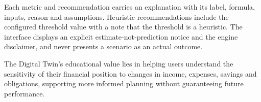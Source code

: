 Each metric and recommendation carries an explanation with its label, formula, inputs, reason and assumptions. Heuristic recommendations include the configured threshold value with a note that the threshold is a heuristic. The interface displays an explicit estimate-not-prediction notice and the engine disclaimer, and never presents a scenario as an actual outcome.

The Digital Twin's educational value lies in helping users understand the sensitivity of their financial position to changes in income, expenses, savings and obligations, supporting more informed planning without guaranteeing future performance.